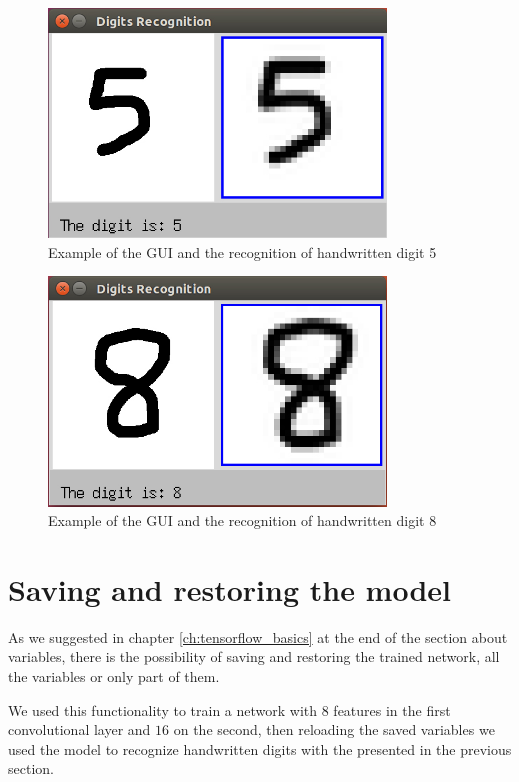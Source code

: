 \begin{figure}
	\caption{Example of the GUI and the recognition of handwritten digit 5}
	\label{fig:GUI_5}
	\centering
	\includegraphics[width=0.8\textwidth]{Images/GUI_5}
\end{figure}

\begin{figure}
\caption{Example of the GUI and the recognition of handwritten digit 8}
\label{fig:GUI_8}
\centering
\includegraphics[width=0.8\textwidth]{Images/GUI_8}
\end{figure}

\section{Saving and restoring the model}

As we suggested in chapter \ref{ch:tensorflow_basics} at the end of the section about variables, there is the possibility of saving and restoring the trained network, all the variables or only part of them.

We used this functionality to train a network with $8$ features in the first convolutional layer and $16$ on the second, then reloading the saved variables we used the model to recognize handwritten digits with the  presented in the previous section.